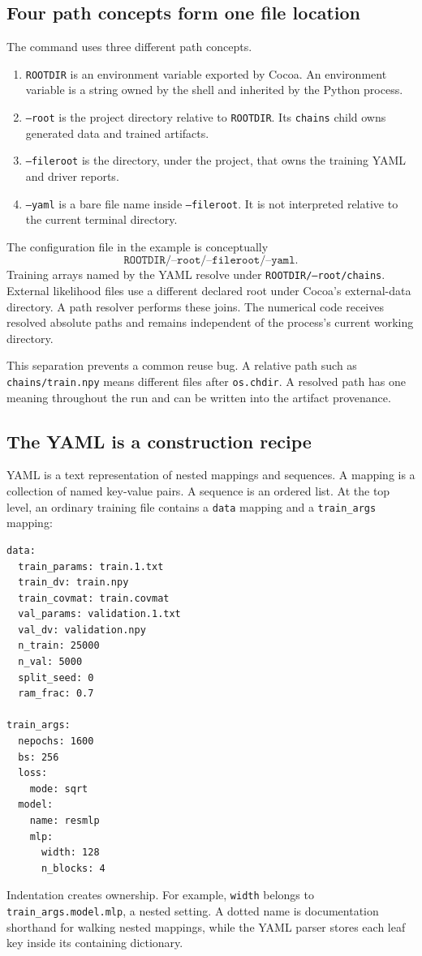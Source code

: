 \documentclass[10pt,aps,prd,twocolumn,nofootinbib]{revtex4-2}
\newcommand{\code}[1]{\texttt{#1}}
\begin{document}
\subsection{Four path concepts form one file location}

The command uses three different path concepts.
\begin{enumerate}
  \item \code{ROOTDIR} is an environment variable exported by Cocoa.  An
  environment variable is a string owned by the shell and inherited by the
  Python process.
  \item \code{--root} is the project directory relative to \code{ROOTDIR}.
  Its \code{chains} child owns generated data and trained artifacts.
  \item \code{--fileroot} is the directory, under the project, that owns the
  training YAML and driver reports.
  \item \code{--yaml} is a bare file name inside \code{--fileroot}.  It is not
  interpreted relative to the current terminal directory.
\end{enumerate}
The configuration file in the example is conceptually
\begin{equation*}
\code{ROOTDIR}/\code{--root}/\code{--fileroot}/\code{--yaml}.
\end{equation*}
Training arrays named by the YAML resolve under
\code{ROOTDIR/--root/chains}.  External likelihood files use a different
declared root under Cocoa's external-data directory.  A path resolver performs
these joins.  The numerical code receives resolved absolute paths and remains
independent of the process's current working directory.

This separation prevents a common reuse bug.  A relative path such as
\code{chains/train.npy} means different files after \code{os.chdir}.  A
resolved path has one meaning throughout the run and can be written into the
artifact provenance.

\subsection{The YAML is a construction recipe}

YAML is a text representation of nested mappings and sequences.  A mapping is
a collection of named key-value pairs.  A sequence is an ordered list.  At the
top level, an ordinary training file contains a \code{data} mapping and a
\code{train\_args} mapping:
\begin{verbatim}
data:
  train_params: train.1.txt
  train_dv: train.npy
  train_covmat: train.covmat
  val_params: validation.1.txt
  val_dv: validation.npy
  n_train: 25000
  n_val: 5000
  split_seed: 0
  ram_frac: 0.7

train_args:
  nepochs: 1600
  bs: 256
  loss:
    mode: sqrt
  model:
    name: resmlp
    mlp:
      width: 128
      n_blocks: 4
\end{verbatim}
Indentation creates ownership.  For example, \code{width} belongs to
\code{train\_args.model.mlp}, a nested setting.  A dotted name is documentation
shorthand for walking nested mappings, while the YAML parser stores each leaf
key inside its containing dictionary.
\end{document}

